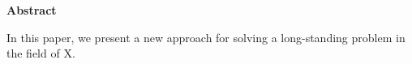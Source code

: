 {}
\begin{center}
	\textbf{\LARGE Abstract}
\end{center}
	In this paper, we present a new approach for solving a long-standing problem in the field of X.
\cleardoublepage